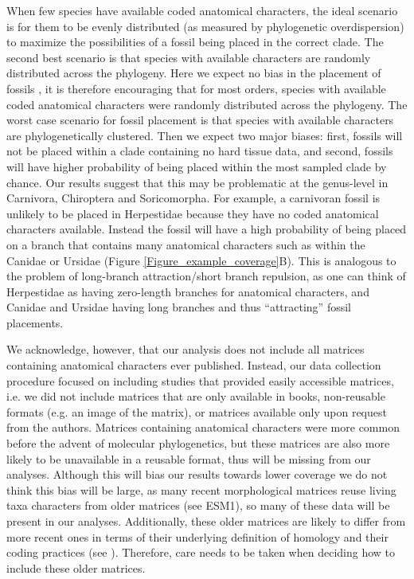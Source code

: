 \documentclass[12pt,letterpaper]{article}
\begin{document}
When few species have available coded anatomical characters, the ideal scenario is for them to be evenly distributed (as measured by phylogenetic overdispersion) to maximize the possibilities of a fossil being placed in the correct clade.
The second best scenario is that species with available characters are randomly distributed across the phylogeny. 
Here we expect no bias in the placement of fossils \cite{GuillermeCooper}, it is therefore encouraging that for most orders, species with available coded anatomical characters were randomly distributed across the phylogeny.
The worst case scenario for fossil placement is that species with available characters are phylogenetically clustered. 
Then we expect two major biases: first, fossils will not be placed within a clade containing no hard tissue data, and second, fossils will have higher probability of being placed within the most sampled clade by chance. 
Our results suggest that this may be problematic at the genus-level in Carnivora, Chiroptera and Soricomorpha. 
For example, a carnivoran fossil is unlikely to be placed in Herpestidae because they have no coded anatomical characters available.
Instead the fossil will have a high probability of being placed on a branch that contains many anatomical characters such as within the Canidae or Ursidae (Figure \ref{Figure_example_coverage}B). 
This is analogous to the problem of long-branch attraction/short branch repulsion, as one can think of Herpestidae as having zero-length branches for anatomical characters, and Canidae and Ursidae having long branches and thus ``attracting'' fossil placements. 

We acknowledge, however, that our analysis does not include all matrices containing anatomical characters ever published.
Instead, our data collection procedure focused on including studies that provided easily accessible matrices, i.e. we did not include matrices that are only available in books, non-reusable formats (e.g. an image of the matrix), or matrices available only upon request from the authors.
Matrices containing anatomical characters were more common before the advent of molecular phylogenetics, but these matrices are also more likely to be unavailable in a reusable format, thus will be missing from our analyses.
Although this will bias our results towards lower coverage we do not think this bias will be large, as many recent morphological matrices reuse living taxa characters from older matrices (see ESM1), so many of these data will be present in our analyses.
Additionally, these older matrices are likely to differ from more recent ones in terms of their underlying definition of homology and their coding practices (see \cite{Brazeau2011}).
Therefore, care needs to be taken when deciding how to include these older matrices.
\end{document}
